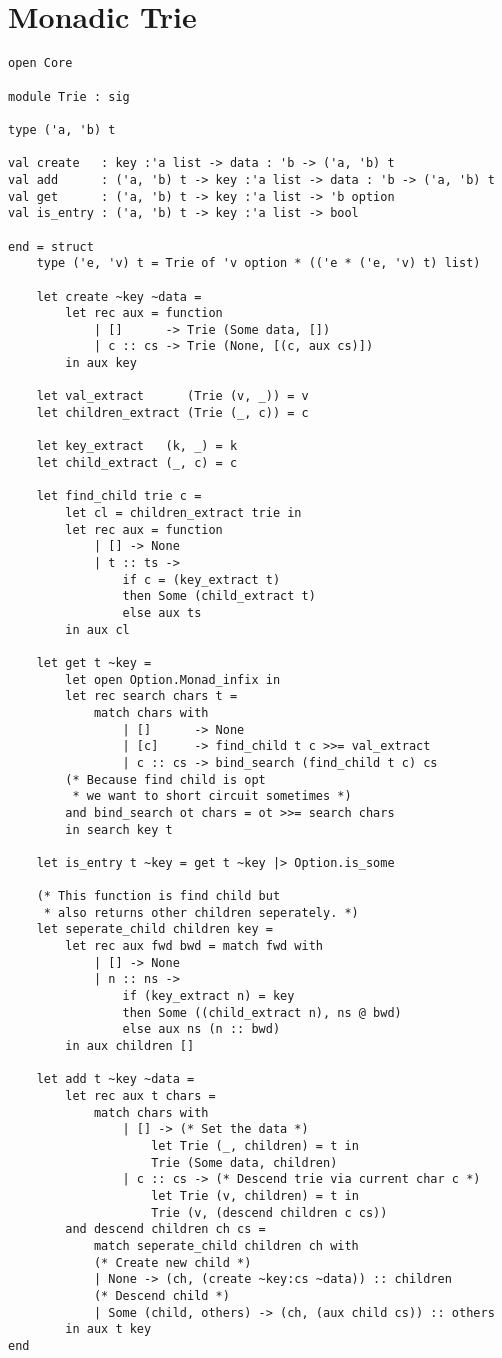 \section{\\Monadic Trie}
\begin{verbatim}
open Core

module Trie : sig

type ('a, 'b) t

val create   : key :'a list -> data : 'b -> ('a, 'b) t
val add      : ('a, 'b) t -> key :'a list -> data : 'b -> ('a, 'b) t
val get      : ('a, 'b) t -> key :'a list -> 'b option
val is_entry : ('a, 'b) t -> key :'a list -> bool

end = struct
    type ('e, 'v) t = Trie of 'v option * (('e * ('e, 'v) t) list)

    let create ~key ~data =
        let rec aux = function
            | []      -> Trie (Some data, [])
            | c :: cs -> Trie (None, [(c, aux cs)])
        in aux key

    let val_extract      (Trie (v, _)) = v
    let children_extract (Trie (_, c)) = c

    let key_extract   (k, _) = k
    let child_extract (_, c) = c

    let find_child trie c =
        let cl = children_extract trie in
        let rec aux = function
            | [] -> None
            | t :: ts ->
                if c = (key_extract t)
                then Some (child_extract t)
                else aux ts
        in aux cl

    let get t ~key =
        let open Option.Monad_infix in
        let rec search chars t =
            match chars with
                | []      -> None
                | [c]     -> find_child t c >>= val_extract
                | c :: cs -> bind_search (find_child t c) cs
        (* Because find child is opt
         * we want to short circuit sometimes *)
        and bind_search ot chars = ot >>= search chars
        in search key t

    let is_entry t ~key = get t ~key |> Option.is_some

    (* This function is find child but
     * also returns other children seperately. *)
    let seperate_child children key =
        let rec aux fwd bwd = match fwd with
            | [] -> None
            | n :: ns ->
                if (key_extract n) = key
                then Some ((child_extract n), ns @ bwd)
                else aux ns (n :: bwd)
        in aux children []

    let add t ~key ~data =
        let rec aux t chars =
            match chars with
                | [] -> (* Set the data *)
                    let Trie (_, children) = t in
                    Trie (Some data, children)
                | c :: cs -> (* Descend trie via current char c *)
                    let Trie (v, children) = t in
                    Trie (v, (descend children c cs))
        and descend children ch cs =
            match seperate_child children ch with
            (* Create new child *)
            | None -> (ch, (create ~key:cs ~data)) :: children
            (* Descend child *)
            | Some (child, others) -> (ch, (aux child cs)) :: others
        in aux t key
end
\end{verbatim}
